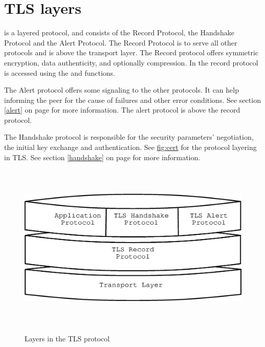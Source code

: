 \section{TLS layers}

\tlsI{} is a layered protocol, and consists of the Record Protocol,
the Handshake Protocol and the Alert Protocol. The Record Protocol
is to serve all other protocols and is above the transport layer.
The Record protocol offers symmetric encryption, data authenticity, and
optionally compression.
In \gnutls{} the record protocol is accessed using the 
 and
functions.

\par
The Alert protocol offers some signaling to the other protocols. It can
help informing the peer for the cause of failures and other error
conditions. See section \ref{alert} on page \pageref{alert} for more information.
The alert protocol is above the record protocol.

\par 
The Handshake protocol is responsible for the security parameters'
negotiation, the initial key exchange and
authentication. See \hyperref{figure}{figure }{}{fig:cert} for the
protocol layering in TLS. 
See section \ref{handshake} on page \pageref{handshake} for more information.

\begin{figure}[hbtp]
\includegraphics[height=8cm,width=12cm]{layers}
\label{fig:layers}
\caption{Layers in the TLS protocol}
\end{figure}


\addvspace{1.5cm}

